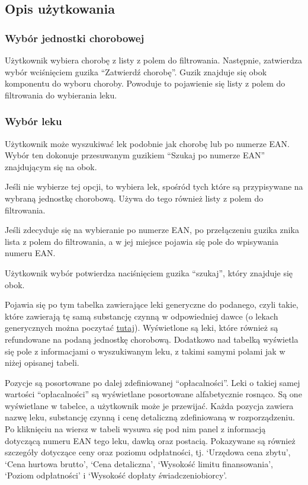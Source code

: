 \documentclass{article}
\begin{document}
    \subsection{Opis użytkowania}
      \subsubsection{Wybór jednostki chorobowej}
      Użytkownik wybiera chorobę z listy z polem do filtrowania.
      Następnie, zatwierdza wybór wciśnięciem guzika ``Zatwierdź chorobę''.
      Guzik znajduje się obok komponentu do wyboru choroby.
      Powoduje to pojawienie się listy z polem do filtrowania do wybierania leku.

      \subsubsection{Wybór leku}
      Użytkownik może wyszukiwać lek podobnie jak chorobę lub po numerze EAN.
      Wybór ten dokonuje przesuwanym guzikiem ``Szukaj po numerze EAN'' znajdującym się na obok.

      Jeśli nie wybierze tej opcji, to wybiera lek, spośród tych które są przypisywane na wybraną jednostkę chorobową.
      Używa do tego również listy z polem do filtrowania.

      Jeśli zdecyduje się na wybieranie po numerze EAN, po przełączeniu guzika znika lista z polem do filtrowania,
      a w jej miejsce pojawia się pole do wpisywania numeru EAN.

      Użytkownik wybór potwierdza naciśnięciem guzika ``szukaj'', który znajduje się obok.

      Pojawia się po tym tabelka zawierające leki generyczne do podanego, czyli takie, które zawierają tę samą substancję czynną w odpowiedniej dawce
      (o lekach generycznych można poczytać \href{https://pl.wikipedia.org/wiki/Lek_generyczny}{tutaj}).
      Wyświetlone są leki, które również są refundowane na podaną jednostkę chorobową.
      Dodatkowo nad tabelką wyświetla się pole z informacjami o wyszukiwanym leku, z takimi samymi polami jak w niżej opisanej tabeli.

      Pozycje są posortowane po dalej zdefiniowanej ``opłacalności''.
      Leki o takiej samej wartości ``opłacalności'' są wyświetlane posortowane alfabetycznie rosnąco.
      Są one wyświetlane w tabelce, a użytkownik może je przewijać.
      Każda pozycja zawiera nazwę leku, substancję czynną i cenę detaliczną zdefiniowaną w rozporządzeniu.
      Po kliknięciu na wiersz w tabeli wysuwa się pod nim panel z informacją dotyczącą numeru EAN tego leku, dawką oraz postacią.
      Pokazywane są również szczegóły dotyczące ceny oraz poziomu odpłatności, tj.
      `Urzędowa cena zbytu',
      `Cena hurtowa brutto',
      `Cena detaliczna',
      `Wysokość limitu finansowania',
      `Poziom odpłatności' i
      `Wysokość dopłaty świadczeniobiorcy'.
\end{document}
